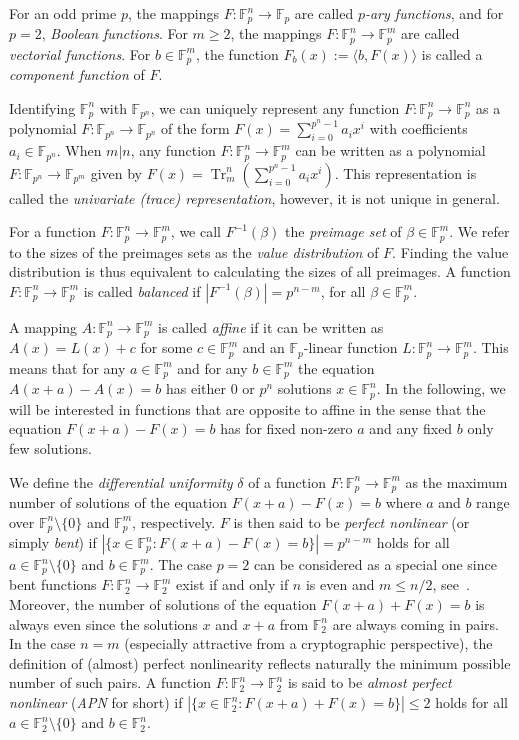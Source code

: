 \documentclass[11pt]{article}
\newcommand{\F}{\mathbb F}
\DeclareMathOperator{\Tr}{Tr}
\theoremstyle{plain}
\theoremstyle{definition}
\numberwithin{theorem}{section}
\numberwithin{equation}{section}
\numberwithin{table}{section}
\numberwithin{figure}{section}
\begin{document}
{For an odd prime $p$, the mappings $F\colon\F_p^n\rightarrow\F_p$ are called \textit{$p$-ary functions}, and for $p=2$, \textit{Boolean functions}. For $m\geq 2$, the mappings $F\colon\F_p^n\rightarrow\F_p^m$ are called \textit{vectorial functions}. For $b\in\F_p^m$, the function $F_b(x):=\langle b,F(x)\rangle$ is called a \textit{component function} of $F$. 

Identifying $\F_p^n$ with $\F_{p^n}$, we can uniquely represent any function $F\colon\F_p^n\to\F_p^n$  as a polynomial $F\colon\F_{p^n}\to\F_{p^n}$ of the form $F(x)=\sum_{i=0}^{p^{n}-1} a_{i} x^{i}$ with coefficients $a_i\in\F_{p^{n}}$. When $m|n$, any function $F\colon\F_p^n\to\F_p^m$ can be written as a polynomial $F\colon\F_{p^n}\to\F_{p^m}$ given by $F(x)=\Tr^{n}_{m}\left(\sum_{i=0}^{p^{n}-1} a_{i} x^{i}\right)$. This representation is called the \textit{univariate (trace) representation}, however, it is not unique in general. 

For a function $F\colon \F_p^n\to \F_p^m $, we call $F^{-1}(\beta)$ the \textit{preimage set} of $\beta \in \F_p^m$. We refer to the sizes of the preimages sets as the \textit{value distribution} of $F$. Finding the value distribution is thus equivalent to calculating the sizes of all preimages. A function $F\colon \F_p^n\to \F_p^m $ is called \textit{balanced} if $|F^{-1}(\beta)|=p^{n-m}$, for all $\beta \in \F_p^m$.

A mapping $A\colon\F_p^n\to\F_p^m$ is called \textit{affine} if it can be written as {$A(x)=L(x)+c$ for some $c \in \F_p^m$} and an $\F_p$-linear function $L \colon \F_p^n \rightarrow \F_p^m$. This means that for any $a\in\F_p^m$ and for any $b\in\F_p^m$ the equation $A(x+a)-A(x)=b$ has either $0$ or $p^n$ solutions $x\in\F_p^n$. In the following, we will be interested in functions that are opposite to affine in the sense that the equation $F(x+a)-F(x)=b$ has for fixed non-zero $a$ and any fixed $b$ only few solutions.

We define the \emph{differential uniformity }$\delta$ of a function $F\colon  \F_p^n \rightarrow \F_p^m$ as the maximum number of solutions of the equation $F(x+a)-F(x)=b$ where $a$ and $b$ range over $\F_p^n\setminus \{0\}$ and $\F_p^m$, respectively. $F$ is then said to be \textit{perfect nonlinear} (or simply \textit{bent}) if $|\{x \in \F_p^n\colon  F(x+a)-F(x)=b\}|=p^{n-m}$ holds for all $a \in \F_p^n \setminus\{0\}$  and $b \in \F_p^m$. The case $p=2$ can be considered as a special one since bent functions $F\colon\F_2^n\to\F_2^m$ exist if and only if $n$ is even and $m\le n/2$, see~\cite{KaiNy91}. Moreover, the number of solutions of the equation $F(x+a)+F(x)=b$ is always even since the solutions $x$ and $x+a$  from $\F_2^n$ are always coming in pairs. In the case $n=m$ (especially attractive from a cryptographic perspective), the definition of (almost) perfect nonlinearity reflects naturally the minimum possible number of such pairs. A function $F\colon  \F_2^n \rightarrow \F_2^n$ is said to be \textit{almost perfect nonlinear} (\textit{APN} for short) if $|\{x \in \F_2^n\colon  F(x+a)+F(x)=b\}|\le 2$ holds for all $a \in \F_2^n \setminus\{0\}$  and $b \in \F_2^n$.

}
\end{document}
